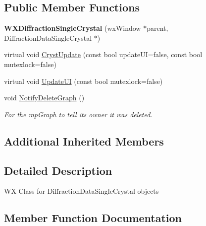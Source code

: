 \subsection*{Public Member Functions}
\begin{DoxyCompactItemize}
\item 
\mbox{\label{class_obj_cryst_1_1_w_x_diffraction_single_crystal_afa08ecf9a4981696d954ca7f45180437}} 
{\bfseries W\+X\+Diffraction\+Single\+Crystal} (wx\+Window $\ast$parent, Diffraction\+Data\+Single\+Crystal $\ast$)
\item 
virtual void \mbox{\hyperlink{class_obj_cryst_1_1_w_x_diffraction_single_crystal_aa66e0abac5c2e4e24ccb1c982548bd4c}{Cryst\+Update}} (const bool update\+UI=false, const bool mutexlock=false)
\item 
virtual void \mbox{\hyperlink{class_obj_cryst_1_1_w_x_diffraction_single_crystal_a2b8ef5fa0663d1526258a17498e9b0fc}{Update\+UI}} (const bool mutexlock=false)
\item 
\mbox{\label{class_obj_cryst_1_1_w_x_diffraction_single_crystal_a52503c26f8efb76d0d00568a5119f8d1}} 
void \mbox{\hyperlink{class_obj_cryst_1_1_w_x_diffraction_single_crystal_a52503c26f8efb76d0d00568a5119f8d1}{Notify\+Delete\+Graph}} ()
\begin{DoxyCompactList}\small\item\em For the mp\+Graph to tell its owner it was deleted. \end{DoxyCompactList}\end{DoxyCompactItemize}
\subsection*{Additional Inherited Members}


\subsection{Detailed Description}
WX Class for Diffraction\+Data\+Single\+Crystal objects 

\subsection{Member Function Documentation}
\mbox{\label{class_obj_cryst_1_1_w_x_diffraction_single_crystal_aa66e0abac5c2e4e24ccb1c982548bd4c}} 
